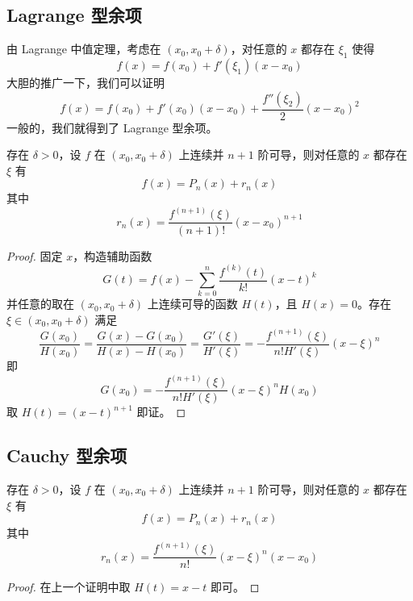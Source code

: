 \subsection{Lagrange 型余项}
由 Lagrange 中值定理，考虑在 $(x_0, x_0 + \delta)$，对任意的 $x$ 都存在 $\xi_1$ 使得
\[ f(x) = f(x_0) + f'(\xi_1)(x-x_0) \]
大胆的推广一下，我们可以证明
\[ f(x) = f(x_0) + f'(x_0)(x-x_0) + \frac{f''(\xi_2)}{2}(x-x_0)^2 \]
一般的，我们就得到了 Lagrange 型余项。

\begin{theorem}
	存在 $\delta > 0$，设 $f$ 在 $(x_0, x_0+\delta)$ 上连续并 $n + 1$ 阶可导，则对任意的 $x$ 都存在 $\xi$ 有
	\[ f(x) = P_n(x) + r_n(x) \]
	其中
	\[ r_n(x) = \frac{f^{(n+1)}(\xi)}{(n+1)!}(x-x_0)^{n+1} \]
\end{theorem}

\begin{proof}
	固定 $x$，构造辅助函数
	\[ G(t) = f(x) - \sum_{k=0}^n \frac{f^{(k)}(t)}{k!} (x-t)^k \]
	并任意的取在 $(x_0, x_0 + \delta)$ 上连续可导的函数 $H(t)$，且 $H(x) = 0$。存在 $\xi \in (x_0, x_0 + \delta)$ 满足
	\[ \frac{G(x_0)}{H(x_0)} = \frac{G(x) - G(x_0)}{H(x) - H(x_0)} = \frac{G'(\xi)}{H'(\xi)} = -\frac{f^{(n+1)}(\xi)}{n!H'(\xi)}(x-\xi)^n \]
	即
	\[ G(x_0) = -\frac{f^{(n+1)}(\xi)}{n! H'(\xi)}(x-\xi)^nH(x_0) \]
	取 $H(t) = (x-t)^{n+1}$ 即证。
\end{proof}

\subsection{Cauchy 型余项}

\begin{theorem}
	存在 $\delta > 0$，设 $f$ 在 $(x_0, x_0+\delta)$ 上连续并 $n + 1$ 阶可导，则对任意的 $x$ 都存在 $\xi$ 有
	\[ f(x) = P_n(x) + r_n(x) \]
	其中
	\[ r_n(x) = \frac{f^{(n+1)}(\xi)}{n!}(x-\xi)^n(x-x_0) \]
\end{theorem}

\begin{proof}
	在上一个证明中取 $H(t) = x - t$ 即可。
\end{proof}

